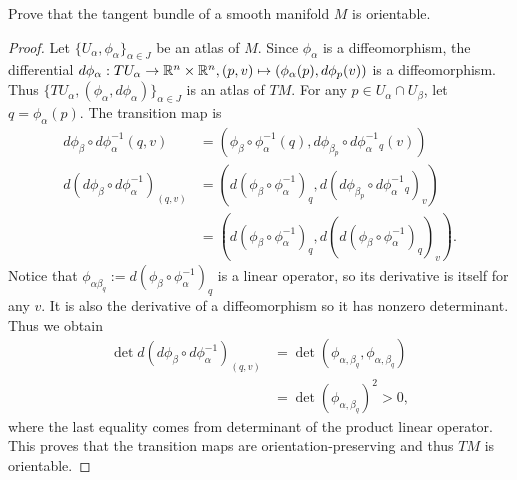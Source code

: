 \documentclass[12pt]{article}
\begin{document}
\begin{problem}[do Carmo 0.2]
Prove that the tangent bundle of a smooth manifold $ M$ is orientable.
\end{problem}
\begin{proof}
Let $ \{U_{ \alpha}, \phi_{ \alpha}\}_{ \alpha \in J} $ be an atlas of $ M$. Since $ \phi_{ \alpha}$ is a diffeomorphism, the differential $ d\phi_{ \alpha}: TU_{ \alpha} \to \mathbb{R}^{n} \times  \mathbb{R}^{n}, (p,v) \mapsto (\phi_{ \alpha}(p), d\phi_p(v)) $ is a diffeomorphism. Thus $ \{TU_{ \alpha}, (\phi_{ \alpha}, d\phi_{ \alpha})\}_{ \alpha \in J} $ is an atlas of $ TM$. For any $ p \in U_{ \alpha} \cap U_{ \beta}$, let $ q = \phi_{ \alpha}(p)$. The transition map is
\begin{align*}
	d\phi_{ \beta} \circ d\phi_{ \alpha}^{-1}(q,v) &= (\phi_{ \beta} \circ \phi_{ \alpha}^{-1}(q), d\phi_{ \beta}_{p} \circ d\phi^{-1}_{ \alpha}_q(v)) \\
	d(d\phi_{ \beta} \circ d\phi_{ \alpha}^{-1})_{(q,v)} &= (d(\phi_{ \beta} \circ \phi_{ \alpha}^{-1})_q, d(d\phi_{ \beta}_{p} \circ d\phi_{ \alpha}^{-1}_q)_v) \\
	&= (d(\phi_{ \beta} \circ \phi_{ \alpha}^{-1})_q,d(d(\phi_{ \beta} \circ \phi_{ \alpha}^{-1})_q)_v).
\end{align*}
Notice that $\phi_{ \alpha \beta }_q := d(\phi_{ \beta} \circ \phi_{ \alpha}^{-1})_q$ is a linear operator, so its derivative is itself for any $ v$. It is also the derivative of a diffeomorphism so it has nonzero determinant. Thus we obtain
\begin{align*}
	\det d(d\phi_{ \beta} \circ d\phi_{ \alpha}^{-1})_{(q,v)}&= \det ( \phi_{ \alpha, \beta}_q, \phi_{ \alpha, \beta}_q) \\
								 &= \det(\phi_{ \alpha, \beta}_q)^2 >0 ,
\end{align*}
where the last equality comes from determinant of the product linear operator. This proves that the transition maps are orientation-preserving and thus $ TM$ is orientable.
\end{proof}
\end{document}

